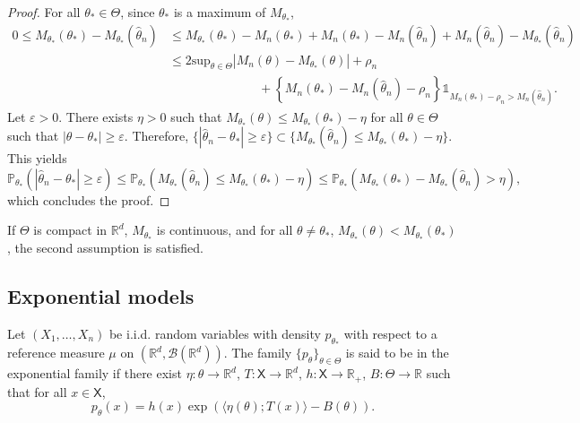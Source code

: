 \documentclass[english,graybox,envcountchap,envcountsame,sectrefs,shortlabels]{svmono}
\theoremstyle{style}
\newcommand{\eqsp}{}
\newcommand{\Xset}{\mathsf{X}}
\begin{document}
\begin{proof}
For all $\theta_*\in\Theta$, since $\theta_*$ is a maximum of $M_{\theta_*}$,
\begin{align*}
0\leq M_{\theta_*}(\theta_*) - M_{\theta_*}(\widehat\theta_n)&\leq  M_{\theta_*}(\theta_*) - M_n(\theta_*) + M_n(\theta_*) - M_n(\widehat\theta_n) + M_n(\widehat\theta_n) - M_{\theta_*}(\widehat\theta_n)\\
&\leq 2 \mathrm{sup}_{\theta\in\Theta}|M_n(\theta)-M_{\theta_*}(\theta)|+ \rho_n \\
&\hspace{3cm} + \left\{M_n(\theta_*)-M_n(\widehat \theta_n)-\rho_n\right\}\mathds{1}_{M_n(\theta_*) - \rho_n>M_n(\widehat \theta_n)}\eqsp.
\end{align*}
Let $\varepsilon>0$. There exists $\eta>0$ such that $M_{\theta_*}(\theta)\leq M_{\theta_*}(\theta_*)-\eta$ for all $\theta\in\Theta$ such that $|\theta-\theta_*|\geq \varepsilon$. Therefore, $\{|\widehat\theta_n-\theta_*|\geq \varepsilon\}\subset\{M_{\theta_*}(\widehat\theta_n)\leq M_{\theta_*}(\theta_*)-\eta\}$. This yields 
$$
\mathbb{P}_{\theta_*}\left(|\widehat\theta_n-\theta_*|\geq \varepsilon\right)\leq \mathbb{P}_{\theta_*}\left(M_{\theta_*}(\widehat\theta_n)\leq M_{\theta_*}(\theta_*)-\eta\right) \leq \mathbb{P}_{\theta_*}\left(M_{\theta_*}(\theta_*) - M_{\theta_*}(\widehat\theta_n)>\eta\right) \eqsp,
$$
which concludes the proof.
\end{proof}

\begin{remark}
If $\Theta$ is compact in $\mathbb{R}^d$, $M_{\theta_*}$ is continuous, and for all $\theta\neq\theta_*$, $M_{\theta_*}(\theta)<M_{\theta_*}(\theta_*)$, the second assumption is satisfied.
\end{remark}

\subsection{Exponential models}
Let $(X_1,\ldots,X_n)$ be i.i.d. random variables with density $p_{\theta_*}$ with respect to a reference measure $\mu$ on $(\mathbb{R}^d,\mathcal{B}(\mathbb{R}^d))$. The family $\{p_\theta\}_{\theta\in\Theta}$ is said to be in the exponential family if there exist $\eta:\theta\to \mathbb{R}^d$, $T:\Xset\to\mathbb{R}^d$, $h:\Xset\to\mathbb{R}_+$, $B:\Theta\to\mathbb{R}$ such that for all $x\in\Xset$,
$$
p_\theta(x) = h(x)\exp\left(\langle \eta(\theta);T(x)\rangle - B(\theta)\right)\eqsp.
$$
\end{document}
